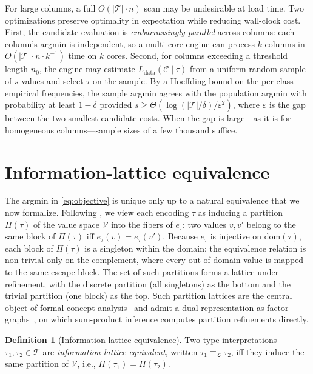 \documentclass[10pt]{article}
\theoremstyle{definition}
\newtheorem{definition}{Definition}
\theoremstyle{remark}
\newcommand{\Vcal}{\mathcal{V}}
\newcommand{\Ccal}{\mathcal{C}}
\newcommand{\Tcal}{\mathcal{T}}
\newcommand{\Ldata}{L_{\mathrm{data}}}
\newcommand{\eqL}{\equiv_{\mathcal{L}}}
\begin{document}
For large columns, a full $O(|\Tcal| \cdot n)$ scan may be undesirable at
load time. Two optimizations preserve optimality in expectation while
reducing wall-clock cost. First, the candidate evaluation is
\emph{embarrassingly parallel} across columns: each column's argmin is
independent, so a multi-core engine can process $k$ columns in
$O(|\Tcal| \cdot n \cdot k^{-1})$ time on $k$ cores. Second, for columns
exceeding a threshold length $n_0$, the engine may estimate
$\Ldata(\Ccal \mid \tau)$ from a uniform random sample of $s$ values and
select $\tau$ on the sample. By a Hoeffding bound on the per-class
empirical frequencies, the sample argmin agrees with the population argmin
with probability at least $1 - \delta$ provided $s \geq
\Theta(\log(|\Tcal|/\delta) / \varepsilon^2)$, where $\varepsilon$ is the
gap between the two smallest candidate costs. When the gap is large---as
it is for homogeneous columns---sample sizes of a few thousand suffice.

\section{Information-lattice equivalence}\label{sec:lattice}

The argmin in \cref{eq:objective} is unique only up to a natural
equivalence that we now formalize. Following \citet{verdu}, we view each
encoding $\tau$ as inducing a partition $\Pi(\tau)$ of the value space
$\Vcal$ into the fibers of $e_\tau$: two values $v, v'$ belong to the same
block of $\Pi(\tau)$ iff $e_\tau(v) = e_\tau(v')$. Because $e_\tau$ is
injective on $\mathrm{dom}(\tau)$, each block of $\Pi(\tau)$ is a
singleton within the domain; the equivalence relation is non-trivial only
on the complement, where every out-of-domain value is mapped to the same
escape block. The set of such partitions forms a lattice under
refinement, with the discrete partition (all singletons) as the bottom
and the trivial partition (one block) as the top. Such partition lattices
are the central object of formal concept analysis~\citep{ganter1999} and
admit a dual representation as factor graphs~\citep{kschischang2001}, on
which sum-product inference computes partition refinements directly.

\begin{definition}[Information-lattice equivalence]\label{def:latticeeq}
Two type interpretations $\tau_1, \tau_2 \in \Tcal$ are
\emph{information-lattice equivalent}, written $\tau_1 \eqL \tau_2$, iff
they induce the same partition of $\Vcal$, i.e., $\Pi(\tau_1) = \Pi(\tau_2)$.
\end{definition}
\end{document}
